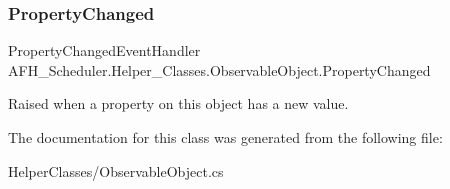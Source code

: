 \subsubsection{PropertyChanged}
{\footnotesize\ttfamily Property\+Changed\+Event\+Handler A\+F\+H\+\_\+\+Scheduler.\+Helper\+\_\+\+Classes.\+Observable\+Object.\+Property\+Changed}



Raised when a property on this object has a new value. 



The documentation for this class was generated from the following file\+:\begin{DoxyCompactItemize}
\item 
Helper\+Classes/Observable\+Object.\+cs\end{DoxyCompactItemize}
